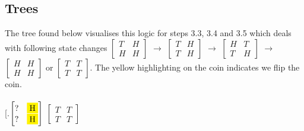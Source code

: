 \documentclass{article}
\begin{document}
\subsection{Trees}
The tree found below visualises this logic for steps 3.3, 3.4 and 3.5 which deals with following state changes $\begin{bmatrix}
        T & H \\
        H & H 
        \end{bmatrix}$ $\rightarrow$ $\begin{bmatrix} 

        T & H \\
        T & H 
        \end{bmatrix}$ $\rightarrow$  $\begin{bmatrix} 

        H & T \\
        T & H
        \end{bmatrix}$ $\rightarrow$ $\begin{bmatrix} 

        H & H \\
        H & H
        \end{bmatrix}$ 
        or 
        $\begin{bmatrix} 

        T & T \\
        T & T
        \end{bmatrix}$. The yellow highlighting on the coin indicates we flip the coin. 
        \\\\
\Tree 
[.{$\begin{bmatrix} T & H \\ H & H \end{bmatrix}$} 
    [.{$\begin{bmatrix}? & H \\ \colorbox{yellow}{H} & ? \end{bmatrix}$} 
        [.{$\begin{bmatrix} T & H \\ T & H \end{bmatrix}$} 
            [.{$\begin{bmatrix} \colorbox{yellow}{T} & ? \\ \colorbox{yellow}{T} & ? \end{bmatrix}$} {$\begin{bmatrix} H & H \\ H & H \end{bmatrix}$}
            ]
            [.{$\begin{bmatrix} ? & \colorbox{yellow}{H} \\ ? & \colorbox{yellow}{H} \end{bmatrix}$} {$\begin{bmatrix} T & T \\ T & T \end{bmatrix}$}
\end{document}
